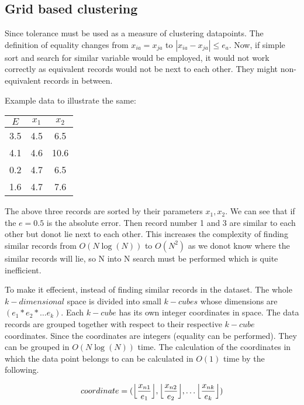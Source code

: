 \subsection{Grid based clustering}

Since tolerance must be used as a measure of clustering datapoints. The definition of equality changes from \(x_{ia} = x_{ja}\) to \(|x_{ia} - x_{ja}| \leq e_a\). Now, if simple sort and search for similar variable would be employed, it would not work correctly as equivalent records would not be next to each other. They might non-equivalent records in between.

Example data to illustrate the same:
\begin{center}
	\begin{tabular}{ | c | c | c |}
		\hline
		\(E\) & \(x_1\) & \(x_2\) \\ \hline
		3.5   & 4.5     & 6.5     \\\hline
		4.1   & 4.6     & 10.6    \\\hline
		0.2   & 4.7     & 6.5     \\\hline
		1.6   & 4.7     & 7.6     \\\hline
		\hline
	\end{tabular}
\end{center}

The above three records are sorted by their parameters \(x_1, x_2\). We can see that if the \(e = 0.5\) is the absolute error. Then record number 1 and 3 are similar to each other but donot lie next to each other. This increases the complexity of finding similar records from \(O(N \log(N))\) to \(O(N^2)\) as we donot know where the similar records will lie, so N into N search must be performed which is quite inefficient.

To make it effecient, instead of finding similar records in the dataset. The whole \(k-dimensional\) space is divided into small \(k-cubes\) whose dimensions are \((e_1 * e_2 * \ldots e_k)\). Each \(k-cube\) has its own integer coordinates in space. The data records are grouped together with respect to their respective \(k-cube\) coordinates. Since the coordinates are integers (equality can be performed). They can be grouped in \(O(N\log(N))\) time. The calculation of the coordinates in which the data point belongs to can be calculated in \(O(1)\) time by the following.

\[coordinate = (\Bigl\lfloor \frac{x_{n1}}{e_1} \Bigl\rfloor, \Bigl\lfloor \frac{x_{n2}}{e_2} \Bigl\rfloor, \ldots \Bigl\lfloor \frac{x_{nk}}{e_k} \Bigl\rfloor)\]


